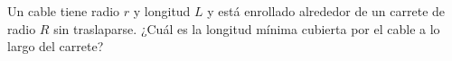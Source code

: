 \item Un cable tiene radio $r$ y longitud $L$ y está enrollado alrededor de un carrete de radio $R$ sin traslaparse. ¿Cuál es la longitud mínima cubierta por el cable a lo largo del carrete?
